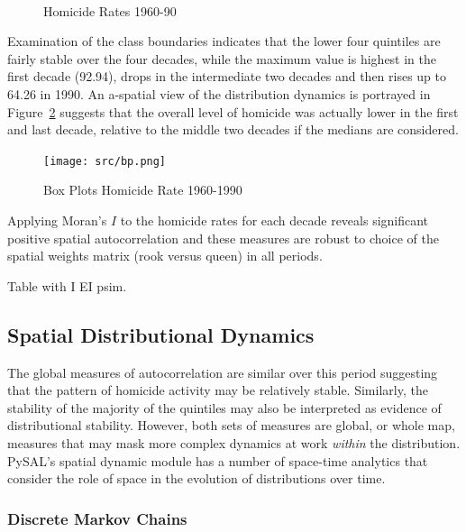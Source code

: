 \documentclass[11pt, titlepage]{article}
\begin{document}
\begin{figure}
  \centering
  \\
  \noindent
\caption[caption]{Homicide Rates 1960-90}
\label{f:hr}
\end{figure}


Examination of the class boundaries indicates that the lower four
quintiles are fairly stable over the four decades, while the maximum
value is highest in the first decade (92.94), drops in the intermediate two
decades and then rises up to 64.26 in 1990. An a-spatial view of the
distribution dynamics is portrayed in Figure~\ref{f:bp} suggests that the overall level
of homicide was actually lower in the first and last decade, relative to
the middle two decades if the medians are considered.


\begin{figure}[ht]
\begin{center}
\texttt{[image: src/bp.png]}
\end{center}
\caption{Box Plots Homicide Rate 1960-1990}
\label{f:bp}
\end{figure}   


Applying Moran's $I$ to the homicide rates for each decade reveals
significant positive spatial autocorrelation and these measures are
robust to choice of the spatial weights matrix (rook versus queen) in
all periods.

Table with I EI psim.

\subsection{Spatial Distributional Dynamics}

The global measures of autocorrelation are similar over this period
suggesting that the pattern of homicide activity may be relatively
stable. Similarly, the stability of the majority of the quintiles may
also be interpreted as evidence of distributional stability. However,
both sets of measures are global, or whole map, measures that may mask
more complex dynamics at work \emph{within} the distribution. PySAL's
spatial dynamic module has a number of space-time analytics that
consider the role of space in the evolution of distributions over time.

\subsubsection{Discrete Markov Chains}
\end{document}
